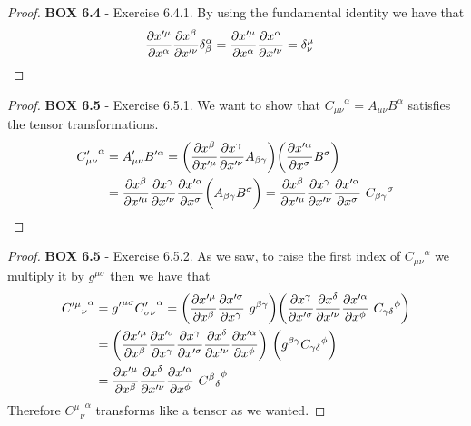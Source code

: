 \documentclass[11pt]{article}
\theoremstyle{definition}
\begin{document}
\begin{proof}{\textbf{BOX 6.4} - Exercise 6.4.1.}
    By using the fundamental identity we have that
    \begin{align*}
        \partialderivative{x'^\mu}{x^\alpha}
        \partialderivative{x^\beta}{x'^\nu} \delta^{\alpha}_\beta
        &= \partialderivative{x'^\mu}{x^\alpha}
        \partialderivative{x^\alpha}{x'^\nu}
        = \delta^\mu_\nu
    \end{align*}
\end{proof}
\begin{proof}{\textbf{BOX 6.5} - Exercise 6.5.1.}
    We want to show that ${C_{\mu\nu}}^\alpha = A_{\mu\nu} B^\alpha$ satisfies
    the tensor transformations.
    \begin{align*}
        {C'_{\mu\nu}}^\alpha &= A'_{\mu\nu} B'^\alpha
        = \bigg(\partialderivative{x^\beta}{x'^\mu}
        \partialderivative{x^\gamma}{x'^\nu} A_{\beta\gamma}\bigg)
        \bigg(\partialderivative{x'^\alpha}{x^\sigma}B^{\sigma}\bigg)\\
        &= \partialderivative{x^\beta}{x'^\mu}
        \partialderivative{x^\gamma}{x'^\nu}
        \partialderivative{x'^\alpha}{x^\sigma}
        \bigg(A_{\beta\gamma}B^{\sigma}\bigg) =
        \partialderivative{x^\beta}{x'^\mu}
        \partialderivative{x^\gamma}{x'^\nu}
        \partialderivative{x'^\alpha}{x^\sigma}~
        {C_{\beta\gamma}}^{\sigma}
    \end{align*}
\end{proof}
\begin{proof}{\textbf{BOX 6.5} - Exercise 6.5.2.}
    As we saw, to raise the first index of ${C_{\mu\nu}}^\alpha$
    we multiply it by $g^{\mu\sigma}$ then we have that
    \begin{align*}
        {{C'^\mu}_{\nu}}^\alpha &= {g'}^{\mu\sigma}{C'_{\sigma\nu}}^\alpha
        = \bigg(\partialderivative{x'^\mu}{x^\beta}
        \partialderivative{x'^\sigma}{x^\gamma}~
        {g}^{\beta\gamma}\bigg)
        \bigg(
        \partialderivative{x^\gamma}{x'^\sigma}
        \partialderivative{x^\delta}{x'^\nu}
        \partialderivative{x'^\alpha}{x^\phi}~
        {C_{\gamma\delta}}^\phi\bigg)\\
        &= \bigg(\partialderivative{x'^\mu}{x^\beta}
        \partialderivative{x'^\sigma}{x^\gamma}
        \partialderivative{x^\gamma}{x'^\sigma}
        \partialderivative{x^\delta}{x'^\nu}
        \partialderivative{x'^\alpha}{x^\phi}\bigg)~
        \bigg({g}^{\beta\gamma}{C_{\gamma\delta}}^\phi\bigg)\\
        &= \partialderivative{x'^\mu}{x^\beta}
        \partialderivative{x^\delta}{x'^\nu}
        \partialderivative{x'^\alpha}{x^\phi}~
        {{C^{\beta}}_{\delta}}^\phi
    \end{align*}
    Therefore ${{C^\mu}_{\nu}}^\alpha$ transforms like a tensor as we wanted.
\end{proof}
\end{document}
